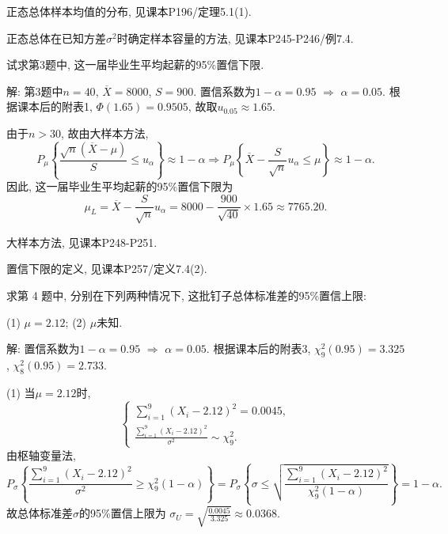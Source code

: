 \documentclass[standard]{ExBook}
\renewenvironment{shaded}{%
  \def\FrameCommand{\fboxsep=\FrameSep \colorbox{shadecolor}}%
  \MakeFramed{\advance\hsize-\width \FrameRestore}%
}{%
  \endMakeFramed
}
\begin{document}
\begin{qitems}
\textcolor{themeColor}{\selectfont {} 正态总体样本均值的分布, 见课本P196/定理5.1(1).}

\textcolor{themeColor}{\selectfont {} 正态总体在已知方差$\sigma^2$时确定样本容量的方法, 见课本P245-P246/例7.4.}

\vspace{2.5cm-5em}

    \begin{bbox}
    \begin{shaded}
        \qitem
试求第3题中, 这一届毕业生平均起薪的95\%置信下限.
    \end{shaded}
    \end{bbox}

\vspace{\dimexpr2.5cm-5em\relax}

解: 第3题中$n=40$, $\overline{X}=8000$, $S=900$. 置信系数为$1-\alpha=0.95$ $\Longrightarrow$ $\alpha=0.05$. 根据课本后的附表1, $\Phi(1.65)=0.9505$, 故取$u_{0.05}\approx1.65$.

由于$n>30$, 故由大样本方法,
$$
P_{\mu}\left\{
\frac{\sqrt{n}(\overline{X}-\mu)}{S}
\leq u_{\alpha}
\right\}
\approx1-\alpha
\Longrightarrow
P_{\mu}\left\{
\overline{X}-\frac{S}{\sqrt{n}}u_{\alpha}
\leq\mu
\right\}
\approx1-\alpha.
$$
因此, 这一届毕业生平均起薪的95\%置信下限为
$$
\mu_L
=
\overline{X}-\frac{S}{\sqrt{n}}u_{\alpha}
=
8000-\frac{900}{\sqrt{40}}\times1.65
\approx7765.20.
$$

\textcolor{themeColor}{\selectfont {} 大样本方法, 见课本P248-P251.}

\textcolor{themeColor}{\selectfont {}
置信下限的定义, 见课本P257/定义7.4(2).}

\vspace{2.5cm-5em}

    \begin{bbox}
    \begin{shaded}
        \qitem
求第 4 题中, 分别在下列两种情况下, 这批钉子总体标准差的95\%置信上限:

(1) $\mu=2.12$; \qquad (2) $\mu$未知.
    \end{shaded}
    \end{bbox}

\vspace{\dimexpr2.5cm-5em\relax}

解: 置信系数为$1-\alpha=0.95$ $\Longrightarrow$ $\alpha=0.05$. 根据课本后的附表3,
$\chi_9^2(0.95)=3.325$, $\chi_8^2(0.95)=2.733$.

(1) 当$\mu=2.12$时,
$$
\left\{
\begin{array}{l}
\displaystyle\sum_{i=1}^{9}(X_i-2.12)^2=0.0045,\\[0.4em]
\displaystyle
\frac{\sum\limits_{i=1}^{9}(X_i-2.12)^2}{\sigma^2}
\sim\chi_9^2.
\end{array}
\right.
$$
由枢轴变量法,
$$
P_{\sigma}\left\{
\frac{\sum\limits_{i=1}^{9}(X_i-2.12)^2}{\sigma^2}
\geq\chi_9^2(1-\alpha)
\right\}
=
P_{\sigma}\left\{
\sigma\leq
\sqrt{\frac{\sum\limits_{i=1}^{9}(X_i-2.12)^2}
{\chi_9^2(1-\alpha)}}
\right\}
=
1-\alpha.
$$
故总体标准差$\sigma$的95\%置信上限为
$
\sigma_U
=
\sqrt{\frac{0.0045}{3.325}}
\approx0.0368
$.


\end{qitems}
\end{document}
